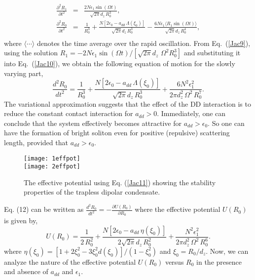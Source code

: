 \documentclass[amsmath,amssymb,article,twocolumn,superscriptaddress,showpacs,10pt]{revtex4-1}
\begin{document}
\begin{eqnarray} 
\frac{\partial^2 R_1}{\partial t^2} & = &\frac{2N\epsilon_1\sin(\Omega t)}{\sqrt{2\pi} d_z \,R_0^3},\label{Jac9}\\
\frac{\partial^2 R_0}{\partial t^2}& = &\frac {1}{R_0^3} + \frac{N[2\epsilon_0-a_{dd}\,\Lambda(\xi_0)]}{\sqrt{2\pi} d_z \,R_0^3}  -\frac{6N\epsilon_1 \langle R_1\sin(\Omega t)\rangle}{\sqrt{2\pi} d_z \,R_0^4}, \nonumber \\ \label{Jac10}
\end{eqnarray}
where $\langle \cdots \rangle$ denotes the time average over the rapid oscillation. From Eq.~(\ref{Jac9}), using the solution $R_1=-2N \epsilon_1 \sin(\Omega t) /[\sqrt{2\pi} d_z \, \, \Omega^2 R_0^3]$ and substituting it into Eq.~(\ref{Jac10}), we obtain the following equation of motion for the slowly varying part,
\begin{equation}
\frac{d^2 R_0}{d t^2}=\frac {1}{R_0^3} + \frac{N[2\epsilon_0-a_{dd}\,\Lambda(\xi_0)]}{\sqrt{2\pi} d_z \,R_0^3}+\frac{6N^2\epsilon_1^2}{2\pi d_z^2\, \Omega^2\,R_0^7}. \label{Jac11}
\end{equation}
The variational approximation suggests that the effect of the DD interaction is to reduce the constant contact interaction for $a_{dd} >0$. Immediately, one can conclude that the system effectively becomes attractive for $a_{dd} > \epsilon_0$. So one can have the formation of bright soliton even for positive (repulsive) scattering length, provided that $a_{dd} > \epsilon_0$. 

\begin{figure}[h!]
\begin{center}
\texttt{[image: 1effpot]}\\%
\texttt{[image: 2effpot]}%
\end{center}
\caption{The effective potential using Eq. (\ref{Jac11}) showing the stability properties of the trapless dipolar condensate.}
\label{f1}
\end{figure}
\noindent 
Eq. (12) can be written as $\frac{d^2 R_0}{d t^2}= - \frac {\partial U(R_0)}{\partial R_0}$ where the effective potential $U(R_0)$ is given by,
%
\begin{equation}
 U(R_0) = \frac {1}{2\,R_0^2} + \frac{N[2\epsilon_0-a_{dd}\,\eta(\xi_0)]}{2\sqrt{2\pi} d_z \,R_0^2}+\frac{N^2\epsilon_1^2}{2\pi d_z^2\,\Omega^2 \,R_0^6}. \label{Jac13}
\end{equation}
\noindent where $ \eta(\xi_0)=[1+2\xi_0^2-3\xi_0^2d(\xi_0)]/ (1-\xi_0^2)$ and $\xi_0=R_0/d_z$. Now, we can analyze the nature of the effective potential $U(R_0)$ versus $R_0$ in the presence and absence of $a_{dd}$ and $\epsilon_1$.
\end{document}
